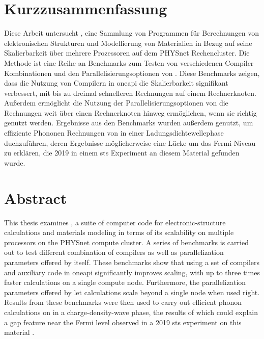 \documentclass[main.tex]{subfiles}
\begin{document}
\section*{Kurzzusammenfassung}

Diese Arbeit untersucht \QE, eine Sammlung von Programmen für Berechnungen von elektronischen Strukturen und Modellierung von Materialien in Bezug auf seine Skalierbarkeit über mehrere Prozessoren auf dem PHYSnet Rechencluster.
Die Methode ist eine Reihe an Benchmarks zum Testen von verschiedenen Compiler Kombinationen und den Parallelisierungsoptionen von \QE.
Diese Benchmarks zeigen, dass die Nutzung von Compilern in \gls{oneapi} die Skalierbarkeit signifikant verbessert, mit bis zu dreimal schnelleren Rechnungen auf einem Rechnerknoten.
Außerdem ermöglicht die Nutzung der Parallelisierungsoptionen von \QE die Rechnungen weit über einen Rechnerknoten hinweg ermöglichen, wenn sie richtig genutzt werden.
Ergebnisse aus den Benchmarks wurden außerdem genutzt, um effiziente Phononen Rechnungen von \TaS in einer Ladungsdichtewellephase duchzuführen, deren Ergebnisse möglicherweise eine Lücke um das Fermi-Niveau zu erklären, die 2019 in einem \gls{sts} Experiment an diesem Material \cite{hall_environmental_2019} gefunden wurde.

\section*{Abstract}

This thesis examines \QE, a suite of computer code for electronic-structure calculations and materials modeling in terms of its scalability on multiple processors on the PHYSnet compute cluster.
A series of benchmarks is carried out to test different combination of compilers as well as parallelization parameters offered by \QE itself.
These benchmarks show that using a set of compilers and auxiliary code in \gls{oneapi} significantly improves scaling, with up to three times faster calculations on a single compute node.
Furthermore, the parallelization parameters offered by \QE let calculations scale beyond a single node when used right.
Results from these benchmarks were then used to carry out efficient phonon calculations on \TaS in a charge-density-wave phase, the results of which could explain a gap feature near the Fermi level observed in a 2019 \gls{sts} experiment on this material \cite{hall_environmental_2019}.
\end{document}
